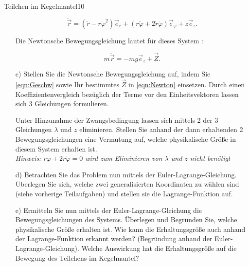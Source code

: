 \begin{exercise}{Teilchen im Kegelmantel}{10}
\begin{enumerate}
    \begin{equation}
      \ddot{\vec{r}} = ( \ddot{r}-r\dot{\varphi}^2)\vec{e}_{r} + (r\ddot{\varphi}
      + 2\dot{r}\dot{\varphi})\vec{e}_{\varphi} + \ddot{z}\vec{e}_{z}.
      \label{eqn:Geschw}
    \end{equation}

    Die Newtonsche Bewegungsgleichung lautet für dieses System :

    \begin{equation}
      m \ddot{\vec{r}} = - mg\vec{e}_{z} + \vec{Z}.
      \label{eqn:Newton}
    \end{equation}

    \item[c)] Stellen Sie die Newtonsche Bewegungsgleichung auf, indem Sie
    \eqref{eqn:Geschw} sowie Ihr bestimmtes $\vec{Z}$ in \eqref{eqn:Newton}
    einsetzen. Durch einen Koeffizientenvergleich bezüglich der Terme vor den
    Einheitsvektoren lassen sich 3 Gleichungen formulieren.

    Unter Hinzunahme der
    Zwangsbedingung lassen sich mittels 2 der 3 Gleichungen $\lambda$ und $z$
    eliminieren. Stellen Sie anhand der dann erhaltenden 2 Bewegungsgleichungen
    eine Vermutung auf, welche physikalische Grö\ss{}e in diesem System erhalten ist.
    \\
    \textit{Hinweis: $r\ddot{\varphi} + 2\dot{r}\dot{\varphi} = 0$ wird zum Eliminieren
    von $\lambda$ und $z$ nicht benötigt}

    \item[d)] Betrachten Sie das Problem nun mittels der Euler-Lagrange-Gleichung.
    Überlegen Sie sich, welche zwei generalisierten Koordinaten zu wählen sind
    (siehe vorherige Teilaufgaben) und stellen sie die Lagrange-Funktion auf.

    \item[e)] Ermitteln Sie nun mittels der Euler-Lagrange-Gleichung die Bewegungsgleichungen
    des Systems. Überlegen und Begründen Sie, welche physikalische Grö\ss{}e erhalten
    ist. Wie kann die Erhaltungsgrö\ss{}e auch anhand der Lagrange-Funktion erkannt
    werden? (Begründung anhand der Euler-Lagrange-Gleichung). Welche Auswirkung
    hat die Erhaltungsgrö\ss{}e auf die Bewegung des Teilchens im Kegelmantel?

  \end{enumerate}
\end{exercise}
